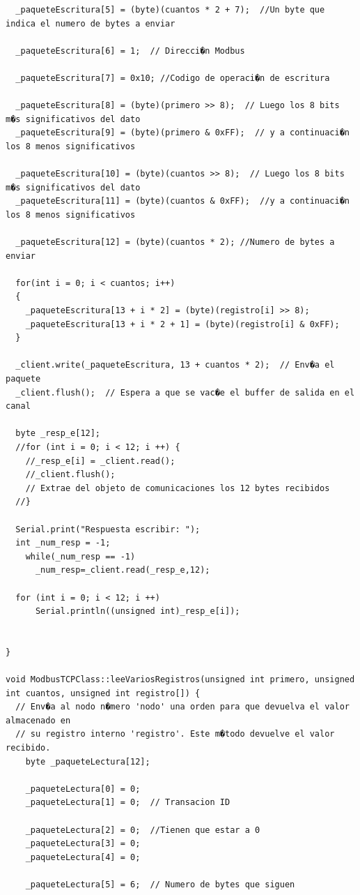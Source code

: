 \documentclass[11pt,twoside]{book}
\begin{document}
\begin{lstlisting}
  _paqueteEscritura[5] = (byte)(cuantos * 2 + 7);  //Un byte que indica el numero de bytes a enviar

  _paqueteEscritura[6] = 1;  // Direcci�n Modbus

  _paqueteEscritura[7] = 0x10; //Codigo de operaci�n de escritura

  _paqueteEscritura[8] = (byte)(primero >> 8);  // Luego los 8 bits m�s significativos del dato
  _paqueteEscritura[9] = (byte)(primero & 0xFF);  // y a continuaci�n los 8 menos significativos

  _paqueteEscritura[10] = (byte)(cuantos >> 8);  // Luego los 8 bits m�s significativos del dato
  _paqueteEscritura[11] = (byte)(cuantos & 0xFF);  //y a continuaci�n los 8 menos significativos

  _paqueteEscritura[12] = (byte)(cuantos * 2); //Numero de bytes a enviar

  for(int i = 0; i < cuantos; i++)
  {
    _paqueteEscritura[13 + i * 2] = (byte)(registro[i] >> 8);
    _paqueteEscritura[13 + i * 2 + 1] = (byte)(registro[i] & 0xFF);
  }

  _client.write(_paqueteEscritura, 13 + cuantos * 2);  // Env�a el paquete
  _client.flush();  // Espera a que se vac�e el buffer de salida en el canal

  byte _resp_e[12];
  //for (int i = 0; i < 12; i ++) {
    //_resp_e[i] = _client.read();
    //_client.flush();
    // Extrae del objeto de comunicaciones los 12 bytes recibidos
  //}

  Serial.print("Respuesta escribir: ");
  int _num_resp = -1;
    while(_num_resp == -1)
      _num_resp=_client.read(_resp_e,12);

  for (int i = 0; i < 12; i ++)
      Serial.println((unsigned int)_resp_e[i]);


}

void ModbusTCPClass::leeVariosRegistros(unsigned int primero, unsigned int cuantos, unsigned int registro[]) {
  // Env�a al nodo n�mero 'nodo' una orden para que devuelva el valor almacenado en
  // su registro interno 'registro'. Este m�todo devuelve el valor recibido.
    byte _paqueteLectura[12];

    _paqueteLectura[0] = 0;
    _paqueteLectura[1] = 0;  // Transacion ID

    _paqueteLectura[2] = 0;  //Tienen que estar a 0
    _paqueteLectura[3] = 0;
    _paqueteLectura[4] = 0;

    _paqueteLectura[5] = 6;  // Numero de bytes que siguen


\end{lstlisting}
\end{document}
